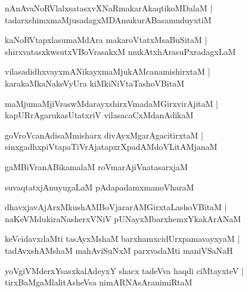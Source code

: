 \documentclass[twoside,12pt,openright]{book}
\newcounter{shloka}[chapter]
\begin{document}
\begin{shloka}%
nAnAvaNoRVlalxsatasxvXNaRmakarAkaqtikoMDalaM |\\
tadarxshimxmaMjusadagxMDAmukurABasamuduyxtiM 
\end{shloka}

\begin{shloka}%
kaNoRVtapxlasumaMdAra makaroVtatxMsaBuSitaM |\\
shirxvatasxkwsutxVBoVrasakxM mukAtxhArasuPxradagxLaM 
\end{shloka}

\begin{shloka}%
vilasadidhxvayxmANikayxmaMjukAMcanamishirxtaM |\\
karakaMkaNakeVyUra kiMkiNiVtaTashoVBitaM 
\end{shloka}

\begin{shloka}%
maMjumaMjiVraswMdarayxshirxVmadaMGirxvirAjitaM |\\
kapURrAgarukasUtatxriV vilasacaCxMdanAdikaM 
\end{shloka}

\begin{shloka}%
goVroVcanAdisaMmisharx divAyxMgarAgacitirxtaM |\\
sinxgadhxpiVtapaTiVrAjatapxrXpadAMdoVLitAMjanaM 
\end{shloka}

\begin{shloka}%
gaMBiVranABikamalaM roVmarAjiVnatasarxjaM
\end{shloka}

\begin{shloka}%
suvaqtatxjAnuyugaLaM pAdapadamxmanoVharaM 
\end{shloka}

\begin{shloka}%
dhavxjavAjArxMkushAMBoVjararAMGirxtaLashoVBitaM |\\
naKeVMdukiraNasherxVNiV pUNayxMbarxhemxYkakArANaM
\end{shloka}

\begin{shloka}%
keVcidavxdaMti tasAyxMshaM barxhamxcidUrxpamavayxyaM |\\
tadAvxshAMshaM mahAviSuNxM parxvadaMti maniVSaNaH 
\end{shloka}

\begin{shloka}%
yoVgiVMderxYsasxkalAdeyxY shacx tadeVva haqdi ciMtayxteV |\\
tirxBaMgaMlalitAsheVsa nimARNAsAranimiRtaM 
\end{shloka}
\end{document}
